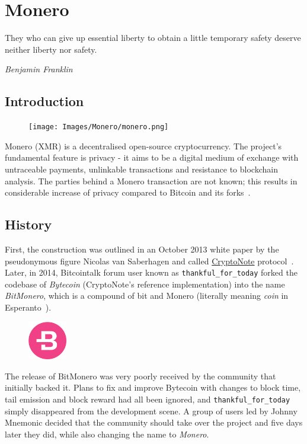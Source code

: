 \chapter{Monero} \label{sec:Monero}
%
\epigraph{They who can give up essential liberty to obtain a little temporary safety deserve neither liberty nor safety.}{\textit{Benjamin Franklin}}
%
\section{Introduction}
\begin{figure}
\centering
\texttt{[image: Images/Monero/monero.png]}
\end{figure}
Monero (XMR) is a decentralised open-source cryptocurrency. The project's fundamental feature is privacy - it aims to be a digital medium of exchange with untraceable payments, unlinkable transactions and resistance to blockchain analysis. The parties behind a Monero transaction are not known; this results in considerable increase of privacy compared to Bitcoin and its forks~\cite{monerodef}.

\section{History}
First, the construction was outlined in an October 2013 white paper by the pseudonymous figure Nicolas van Saberhagen and called \hyperref[sec:CryptoNote]{CryptoNote}  protocol~\cite{citeulike:14139412}. Later, in 2014, Bitcointalk forum user known as \verb|thankful_for_today| forked the codebase of \emph{Bytecoin} (CryptoNote's reference implementation) into the name \emph{BitMonero}, which is a compound of bit and Monero (literally meaning \emph{coin} in Esperanto~\cite{esperanto}).

\begin{figure}
\centering
\includegraphics[width=0.15\textwidth]{Images/Monero/bytecoin.png}
\end{figure}
The release of BitMonero was very poorly received by the community that initially backed it. Plans to fix and improve Bytecoin with changes to block time, tail emission and block reward had all been ignored, and \verb|thankful_for_today| simply disappeared from the development scene. A group of users led by Johnny Mnemonic decided that the community should take over the project and five days later they did, while also changing the name to \emph{Monero}.
\pagebreak

